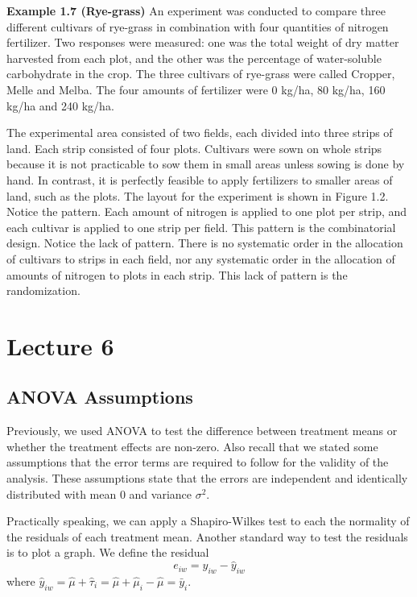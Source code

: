 \documentclass[12pt, oneside]{article}
\begin{document}
\textbf{Example 1.7 (Rye-grass)} An experiment was conducted to compare three different cultivars
of rye-grass in combination with four quantities of nitrogen fertilizer. Two responses were
measured: one was the total weight of dry matter harvested from each plot, and the other was
the percentage of water-soluble carbohydrate in the crop.
The three cultivars of rye-grass were called Cropper, Melle and Melba. The four amounts of fertilizer were 0 kg/ha, 80 kg/ha, 160 kg/ha and 240 kg/ha.

The experimental area consisted of two fields, each divided into three strips of land. Each
strip consisted of four plots. Cultivars were sown on whole strips because it is not practicable to sow them in small
areas unless sowing is done by hand. In contrast, it is perfectly feasible to apply fertilizers to
smaller areas of land, such as the plots. The layout for the experiment is shown in Figure 1.2.
Notice the pattern. Each amount of nitrogen is applied to one plot per strip, and each
cultivar is applied to one strip per field. This pattern is the combinatorial design.
Notice the lack of pattern. There is no systematic order in the allocation of cultivars to
strips in each field, nor any systematic order in the allocation of amounts of nitrogen to plots
in each strip. This lack of pattern is the randomization.

\section{Lecture 6}

\subsection{ANOVA Assumptions}

Previously, we used ANOVA to test the difference between treatment means or whether the treatment effects are non-zero. Also recall that we stated some assumptions that the error terms are required to follow for the validity of the analysis. These assumptions state that the errors are independent and identically distributed with mean 0 and variance $\sigma^{2}$.

Practically speaking, we can apply a Shapiro-Wilkes test to each the normality of the residuals of each treatment mean. Another standard way to test the residuals is to plot a graph. We define the residual 
\[e_{iw} = y_{iw} - \hat{y}_{iw}\] where $\hat{y}_{iw} = \hat{\mu} + \hat{\tau}_{i} = \hat{\mu} + \hat{\mu}_{i} - \hat{\mu} = \bar{y}_{i}$.
\end{document}

